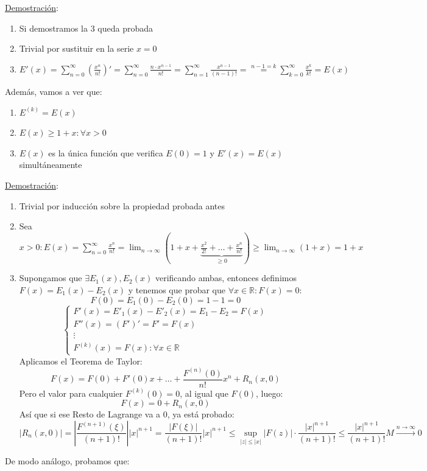 \documentclass[10pt,a4paper,openright]{book}
\begin{document}
\underline{Demostración}:
\begin{enumerate}
\item Si demostramos la 3 queda probada
\item Trivial por sustituir en la serie $x=0$
\item $E'(x) = \sum_{n=0}^{\infty} (\frac{x^n}{n!})' = \sum_{n=0}^{\infty} \frac{n \cdot x^{n-1}}{n!} = \sum_{n=1}^{\infty} \frac{ x^{n-1}}{(n-1)!} = \overset{n-1=k} = \sum_{k=0}^{\infty} \frac{x^k}{k!} = E(x)$
\end{enumerate}
Además, vamos a ver que:
\begin{enumerate}
\item $ E^{(k)} = E(x) $
\item $ E(x) \geq 1 + x : \forall x > 0 $
\item $E(x)$ es la única función que verifica $E(0)=1$ y $E'(x) = E(x)$ simultáneamente
\end{enumerate}
\underline{Demostración}:
\begin{enumerate}
\item Trivial por inducción sobre la propiedad probada antes
\item Sea $x > 0 : E(x) = \sum_{n=0}^{\infty} \frac{x^n}{n!} = \lim_{n \to \infty} ( 1 + x + \underbrace{\frac{x^2}{2!} + \ldots + \frac{x^n}{n!}}_{\geq 0}) \geq \lim_{n \to \infty} (1+x) = 1+ x$
\item Supongamos que $\exists E_1 (x),  E_2 (x)$ verificando ambas, entonces definimos $F(x) = E_1 (x) - E_2(x)$ y tenemos que probar que $\forall x \in \mathbb R : F(x) = 0$:
$$F(0) = E_1 (0) - E_2 (0) = 1 -1 = 0$$
$$\begin{cases} F'(x) = E'_1(x) - E'_2 (x) = E_1 - E_2 = F(x) \\
F''(x) = (F')' = F' = F(x) \\
\vdots \\
F^{(k)}(x) = F(x) : \forall x \in \mathbb{R} \end{cases}$$
Aplicamos el Teorema de Taylor:
$$F(x) = F(0) + F'(0)x + \ldots + \frac{F^{(n)} (0)}{n!} x^n + R_n (x,0)$$
Pero el valor para cualquier $F^{(k)}(0) = 0$, al igual que $F(0)$, luego:
$$F(x) = 0 +R_n (x,0)$$
Así que si ese Resto de Lagrange va a 0, ya está probado:
$$|R_n (x,0)| = \left| \frac{F^{(n+1)} (\xi)}{(n+1)!}\right| |x|^{n+1} = \frac{|F(\xi)|}{(n+1)!} |x|^{n+1} \leq \underset{|z| \leq |x|} {\sup} |F(z)| \cdot \frac{|x|^{n+1}}{(n+1)!} \leq \frac{|x|^{n+1}}{(n+1)!} M \overset{n \to \infty}{\longrightarrow} 0 $$
\end{enumerate}
De modo análogo, probamos que:
\end{document}

